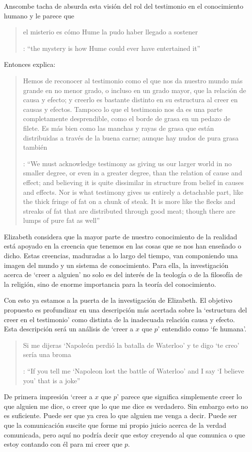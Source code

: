 Anscombe tacha de absurda esta visión del rol del testimonio en el conocimiento humano y le parece que \blockquote[{\cite[Cf.~][3]{anscombe2008faith:tobelieve}}: \enquote{the mystery is how Hume could ever have entertained it}]{el misterio es cómo Hume la pudo haber llegado a sostener}. Entonces explica: \blockquote[{\cite[3]{anscombe2008faith:tobelieve}}: \enquote{We must acknowledge testimony as giving us our larger world in no smaller degree, or even in a greater degree, than the relation of cause and effect; and believing it is quite dissimilar in structure from belief in causes and effects. Nor is what testimony gives us entirely a detachable part, like the thick fringe of fat on a chunk of steak. It is more like the flecks and streaks of fat that are distributed through good meat; though there are lumps of pure fat as well}]{Hemos de reconocer al testimonio como el que nos da nuestro mundo más grande en no menor grado, o incluso en un grado mayor, que la relación de causa y efecto; y creerlo es bastante distinto en su estructura al creer en causas y efectos. Tampoco lo que el testimonio nos da es una parte completamente desprendible, como el borde de grasa en un pedazo de filete. Es más bien como las manchas y rayas de grasa que están distribuidas a través de la buena carne; aunque hay nudos de pura grasa también} Elizabeth considera que la mayor parte de nuestro conocimiento de la realidad está apoyado en la creencia que tenemos en las cosas que se nos han enseñado o dicho. Estas creencias, maduradas a lo largo del tiempo, van componiendo una imagen del mundo y un sistema de conocimiento. Para ella, la investigación acerca de `creer a alguien' no solo es del interés de la teología o de la filosofía de la religión, sino de enorme importancia para la teoría del conocimiento.

Con esto ya estamos a la puerta de la investigación de Elizabeth. El objetivo propuesto es profundizar en una descripción más acertada sobre la `estructura del creer en el testimonio' como distinta de la inadecuada relación causa y efecto. Esta descripción será un análisis de \enquote*{creer a $x$ que $p$} entendido como `fe humana'.

\label{subsec:presups}
\blockquote[{\cite[4]{anscombe2008faith:tobelieve}}: \enquote{If you tell me `Napoleon lost the battle of Waterloo' and I say `I believe you' that is a joke}]{Si me dijeras `Napoleón perdió la batalla de Waterloo' y te digo `te creo' sería una broma}. De primera impresión \enquote*{creer a $x$ que $p$} parece que significa simplemente creer lo que alguien me dice, o creer que lo que me dice es verdadero. Sin embargo esto no es suficiente. Puede ser que ya crea lo que alguien me venga a decir. Puede ser que la comunicación suscite que forme mi propio juicio acerca de la verdad comunicada, pero aquí no podría decir que estoy creyendo al que comunica o que estoy contando con él para mi creer que $p$.

